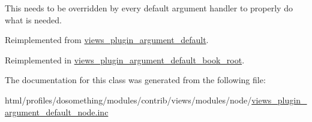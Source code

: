This needs to be overridden by every default argument handler to properly do what is needed. 

Reimplemented from \hyperlink{classviews__plugin__argument__default_a8e67864f4a1ce20b12bc82afe1acd255}{views\_\-plugin\_\-argument\_\-default}.

Reimplemented in \hyperlink{classviews__plugin__argument__default__book__root_a9bc64d2056dce0bc3f98b9d31294fec3}{views\_\-plugin\_\-argument\_\-default\_\-book\_\-root}.

The documentation for this class was generated from the following file:\begin{DoxyCompactItemize}
\item 
html/profiles/dosomething/modules/contrib/views/modules/node/\hyperlink{views__plugin__argument__default__node_8inc}{views\_\-plugin\_\-argument\_\-default\_\-node.inc}\end{DoxyCompactItemize}

